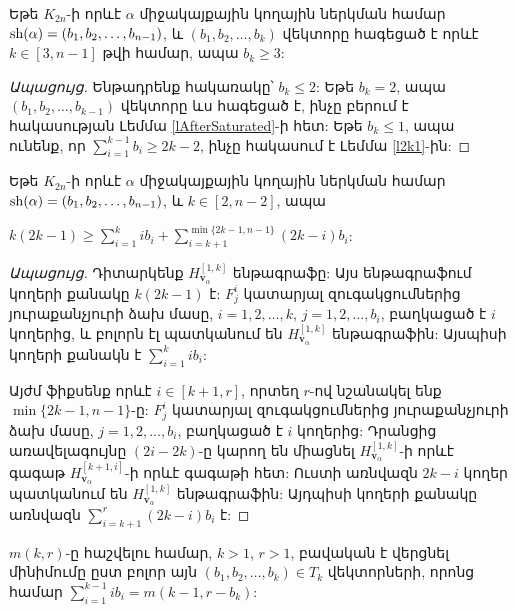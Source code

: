 \begin{hide}
\begin{lemma}
\label{lBeforeSaturated}
Եթե $K_{2n}$-ի որևէ $\alpha$ միջակայքային կողային ներկման համար ${\rm sh}(\alpha) = (b_1,b_2,\ldots, b_{n-1})$, և $(b_1,b_2,\ldots,b_k)$ վեկտորը հագեցած է որևէ $k \in [3,n-1]$ թվի համար, ապա $b_{k} \geq 3$:
\end{lemma}

\begin{proof}[Ապացույց]
Ենթադրենք հակառակը՝ $b_k \leq 2$: Եթե $b_k=2$, ապա $(b_1,b_2,\ldots,b_{k-1})$ վեկտորը ևս հագեցած է, ինչը բերում է հակասության Լեմմա \ref{lAfterSaturated}-ի հետ: Եթե $b_k \leq 1$, ապա ունենք, որ $\sum\limits_{i=1}^{k-1}{b_i} \geq 2k-2$, ինչը հակասում է Լեմմա \ref{l2k1}-ին:
\end{proof}



\begin{lemma}
\label{lEdgeCount}
Եթե $K_{2n}$-ի որևէ $\alpha$ միջակայքային կողային ներկման համար ${\rm sh}(\alpha) = (b_1,b_2,\ldots, b_{n-1})$, և $k \in [2,n-2]$, ապա
\begin{center}
$k(2k-1) \geq \sum\limits_{i=1}^{k}{ib_i} + \sum\limits_{i=k+1}^{\min\{2k-1,n-1\}}{(2k-i)b_i}$:
\end{center}
\end{lemma}
\begin{proof}[Ապացույց]
Դիտարկենք $H_{\mathbf{v}_\alpha}^{[1,k]}$ ենթագրաֆը: Այս ենթագրաֆում կողերի քանակը $k(2k-1)$ է: $F^i_j$ կատարյալ զուգակցումներից յուրաքանչյուրի ձախ մասը, $i=1,2,\ldots,k$, $j=1,2,\ldots,b_i$, բաղկացած է $i$ կողերից, և բոլորն էլ պատկանում են $H_{\mathbf{v}_\alpha}^{[1,k]}$ ենթագրաֆին: Այսպիսի կողերի քանակն է $\sum\limits_{i=1}^{k}{ib_i}$:

Այժմ ֆիքսենք որևէ $i \in [k+1,r]$, որտեղ $r$-ով նշանակել ենք $\min\{2k-1,n-1\}$-ը: $F_j^i$ կատարյալ զուգակցումներից յուրաքանչյուրի ձախ մասը, $j=1,2,\ldots,b_i$, բաղկացած է $i$ կողերից: Դրանցից առավելագույնը $(2i-2k)$-ը կարող են միացնել $H_{\mathbf{v}_\alpha}^{[1,k]}$-ի որևէ գագաթ $H_{\mathbf{v}_\alpha}^{[k+1,i]}$-ի որևէ գագաթի հետ: Ուստի առնվազն $2k-i$ կողեր պատկանում են $H_{\mathbf{v}_\alpha}^{[1,k]}$ ենթագրաֆին: Այդպիսի կողերի քանակը առնվազն $\sum\limits_{i=k+1}^{r}{(2k-i)b_i}$ է:
\end{proof}

\begin{remark}
$m(k,r)$-ը հաշվելու համար, $k>1$, $r>1$, բավական է վերցնել մինիմումը ըստ բոլոր այն $(b_1,b_2,\ldots,b_k) \in T_k$ վեկտորների, որոնց համար $\sum\limits_{i=1}^{k-1}{ib_i} = m(k-1,r-b_k)$:
\end{remark}



\end{hide}

